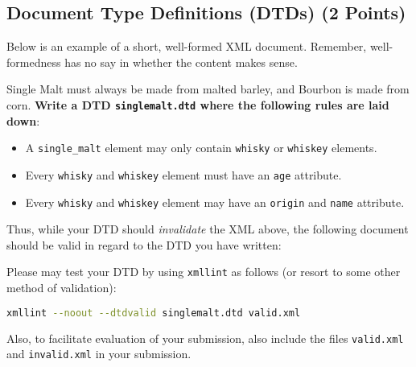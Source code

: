 \documentclass[a4paper, 12pt]{scrartcl}
\begin{document}
\noindent 

\subsection{Document Type Definitions (DTDs) (2 Points)}

Below is an example of a short, well-formed XML document. Remember, well-formedness has no say in whether the content makes sense.




\noindent Single Malt must always be made from malted barley, and Bourbon is made from corn. \textbf{Write a DTD \texttt{singlemalt.dtd} where the following rules are laid down}:
\begin{itemize}
   \item A \texttt{single\_malt} element may only contain \texttt{whisky} or \texttt{whiskey} elements.
   \item Every \texttt{whisky} and \texttt{whiskey} element must have an \texttt{age} attribute.
   \item Every \texttt{whisky} and \texttt{whiskey} element may have an \texttt{origin} and \texttt{name} attribute.
\end{itemize}

Thus, while your DTD should \textit{invalidate} the XML above, the following document should be valid in regard to the DTD you have written:



\noindent Please may test your DTD by using \texttt{xmllint} as follows (or resort to some other method of validation):

\begin{lstlisting}[language=bash]
  xmllint --noout --dtdvalid singlemalt.dtd valid.xml
\end{lstlisting}

\noindent Also, to facilitate evaluation of your submission, also include the files \texttt{valid.xml} and \texttt{invalid.xml} in your submission.
\end{document}
